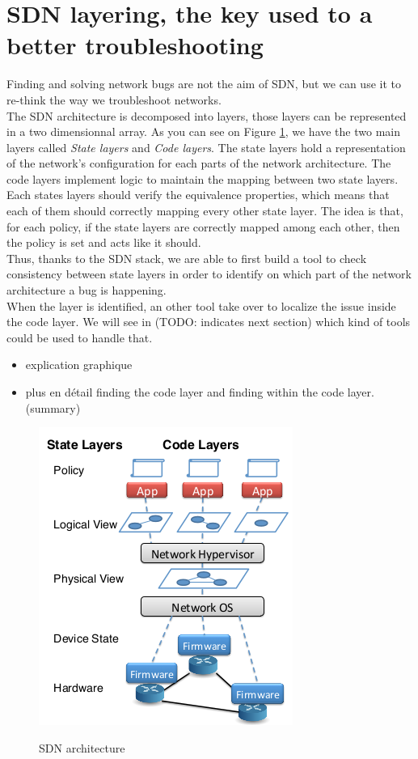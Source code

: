 \documentclass[10pt,article]{IEEEtran}
\begin{document}
\section{SDN layering, the key used to a better troubleshooting}\label{layering}
Finding and solving network bugs are not the aim of SDN, but we can use it to re-think the way we troubleshoot networks.\\ The SDN architecture is decomposed into  layers, those layers can be represented in a two dimensionnal array. As you can see on Figure \ref{layers}, we have the two main layers called \textit{State layers} and \textit{Code layers}. The state layers hold a representation of the network's configuration for each parts of the network architecture. The code layers implement logic to maintain the mapping between two state layers. Each states layers should verify the equivalence properties, which means that each of them should correctly mapping every other state layer. The idea is that, for each policy, if the state layers are correctly mapped among each other, then the policy is  set and acts like it should.\\
Thus, thanks to the SDN stack, we are able to first build a tool to check consistency between state layers in order to identify on which part of the network architecture a bug is happening. \\
When the layer is identified, an other tool take over to localize the issue inside the code layer. We will see in (TODO: indicates next section) which kind of tools could be used to handle that.
\begin{itemize}
\item explication graphique
\item plus en détail finding the code layer and finding within the code layer. (summary)
\end{itemize}
\begin{figure}
\includegraphics[scale=0.65]{layers.png}
\label{layers}
\caption{SDN architecture}
\end{figure}
\end{document}
